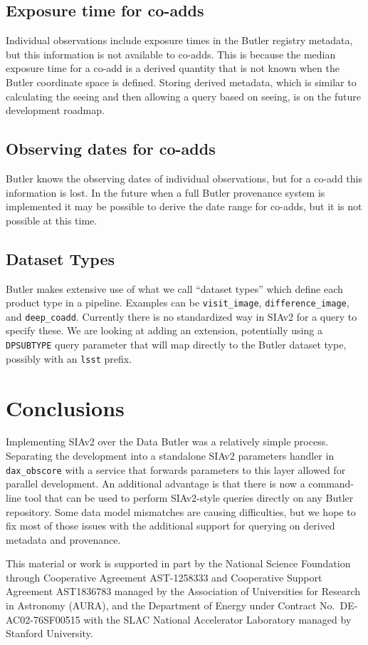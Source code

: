 \documentclass[11pt,twoside]{article}
\begin{document}
\subsection{Exposure time for co-adds}

Individual observations include exposure times in the Butler registry metadata, but this information is not available to co-adds.
This is because the median exposure time for a co-add is a derived quantity that is not known when the Butler coordinate space is defined.
Storing derived metadata, which is similar to calculating the seeing and then allowing a query based on seeing, is on the future development roadmap.

\subsection{Observing dates for co-adds}

Butler knows the observing dates of individual observations, but for a co-add this information is lost.
In the future when a full Butler provenance system is implemented it may be possible to derive the date range for co-adds, but it is not possible at this time.

\subsection{Dataset Types}

Butler makes extensive use of what we call ``dataset types'' which define each product type in a pipeline.
Examples can be \texttt{visit\_image}, \texttt{difference\_image}, and \texttt{deep\_coadd}.
Currently there is no standardized way in SIAv2 for a query to specify these.
We are looking at adding an extension, potentially using a \texttt{DPSUBTYPE} query parameter that will map directly to the Butler dataset type, possibly with an \texttt{lsst} prefix.

\section{Conclusions}

Implementing SIAv2 over the Data Butler was a relatively simple process.
Separating the development into a standalone SIAv2 parameters handler in \texttt{dax\_obscore} with a service that forwards parameters to this layer allowed for parallel development.
An additional advantage is that there is now a command-line tool that can be used to perform SIAv2-style queries directly on any Butler repository.
Some data model mismatches are causing difficulties, but we hope to fix most of those issues with the additional support for querying on derived metadata and provenance.

\acknowledgments This material or work is supported in part by the National Science Foundation through Cooperative Agreement AST-1258333 and Cooperative Support Agreement AST1836783 managed by the Association of Universities for Research in Astronomy (AURA), and the Department of Energy under Contract No.\ DE-AC02-76SF00515 with the SLAC National Accelerator Laboratory managed by Stanford University.


\end{document}

